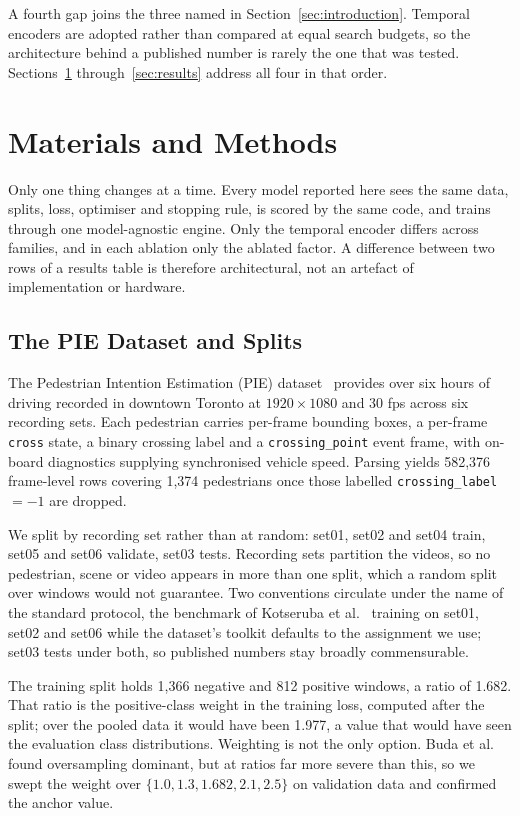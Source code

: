 \documentclass[mti,article,submit,moreauthors]{Definitions/mdpi}
\begin{document}
A fourth gap joins the three named in Section~\ref{sec:introduction}. Temporal encoders are adopted rather than compared at equal search budgets, so the architecture behind a published number is rarely the one that was tested. Sections~\ref{sec:methods} through~\ref{sec:results} address all four in that order.

\section{Materials and Methods}
\label{sec:methods}

Only one thing changes at a time. Every model reported here sees the same data, splits, loss, optimiser and stopping rule, is scored by the same code, and trains through one model-agnostic engine. Only the temporal encoder differs across families, and in each ablation only the ablated factor. A difference between two rows of a results table is therefore architectural, not an artefact of implementation or hardware.

\subsection{The PIE Dataset and Splits}

The Pedestrian Intention Estimation (PIE) dataset~\citep{rasouli2019pie} provides over six hours of driving recorded in downtown Toronto at $1920 \times 1080$ and 30 fps across six recording sets. Each pedestrian carries per-frame bounding boxes, a per-frame \texttt{cross} state, a binary crossing label and a \texttt{crossing\_point} event frame, with on-board diagnostics supplying synchronised vehicle speed. Parsing yields 582,376 frame-level rows covering 1,374 pedestrians once those labelled \texttt{crossing\_label}~$=-1$ are dropped.

We split by recording set rather than at random: set01, set02 and set04 train, set05 and set06 validate, set03 tests. Recording sets partition the videos, so no pedestrian, scene or video appears in more than one split, which a random split over windows would not guarantee. Two conventions circulate under the name of the standard protocol, the benchmark of Kotseruba et al.~\citep{kotseruba2021benchmark} training on set01, set02 and set06 while the dataset's toolkit defaults to the assignment we use; set03 tests under both, so published numbers stay broadly commensurable.

The training split holds 1,366 negative and 812 positive windows, a ratio of 1.682. That ratio is the positive-class weight in the training loss, computed after the split; over the pooled data it would have been 1.977, a value that would have seen the evaluation class distributions. Weighting is not the only option. Buda et al.~\citep{buda2018systematic} found oversampling dominant, but at ratios far more severe than this, so we swept the weight over $\{1.0, 1.3, 1.682, 2.1, 2.5\}$ on validation data and confirmed the anchor value.
\end{document}
